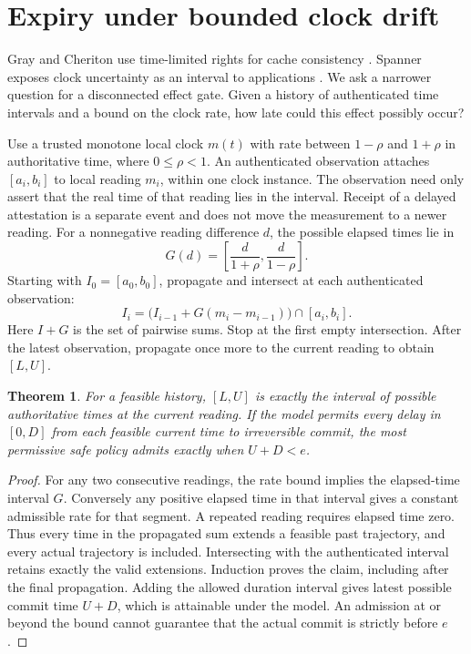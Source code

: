 \documentclass[11pt]{article}
\newtheorem{theorem}{Theorem}
\begin{document}
\section{Expiry under bounded clock drift}
Gray and Cheriton use time-limited rights for cache consistency
\cite{gray}. Spanner exposes clock uncertainty as an interval to
applications \cite{corbett}. We ask a narrower question for a
disconnected effect gate. Given a history of authenticated time
intervals and a bound on the clock rate, how late could this effect
possibly occur?

Use a trusted monotone local clock $m(t)$ with rate between
$1-\rho$ and $1+\rho$ in authoritative time, where $0\le\rho<1$.
An authenticated observation attaches $[a_i,b_i]$ to local
reading $m_i$, within one clock instance. The observation
need only assert that the real time of that reading lies in
the interval. Receipt of a delayed attestation is a separate
event and does not move the measurement to a newer reading.
For a nonnegative reading difference $d$, the possible elapsed
times lie in
\[
 G(d)=\left[\frac{d}{1+\rho},\frac{d}{1-\rho}\right].
\]
Starting with $I_0=[a_0,b_0]$, propagate and intersect at each
authenticated observation:
\[
 I_i=\bigl(I_{i-1}+G(m_i-m_{i-1})\bigr)\cap[a_i,b_i].
\]
Here $I+G$ is the set of pairwise sums. Stop at the first
empty intersection. After the latest observation, propagate
once more to the current reading to obtain $[L,U]$.

\begin{theorem}
For a feasible history, $[L,U]$ is exactly the interval of
possible authoritative times at the current reading. If the
model permits every delay in $[0,D]$ from each feasible current
time to irreversible commit, the most permissive safe policy
admits exactly when $U+D<e$.
\end{theorem}
\begin{proof}
For any two consecutive readings, the rate bound implies the
elapsed-time interval $G$. Conversely any positive elapsed time
in that interval gives a constant admissible rate for that
segment. A repeated reading requires elapsed time zero.
Thus every time in the propagated sum extends a feasible past
trajectory, and every actual trajectory is included. Intersecting
with the authenticated interval retains exactly the valid
extensions. Induction proves the claim, including after the
final propagation. Adding the allowed duration interval gives
latest possible commit time $U+D$, which is attainable under
the model. An admission at or beyond the bound cannot guarantee
that the actual commit is strictly before $e$.
\end{proof}
\end{document}
